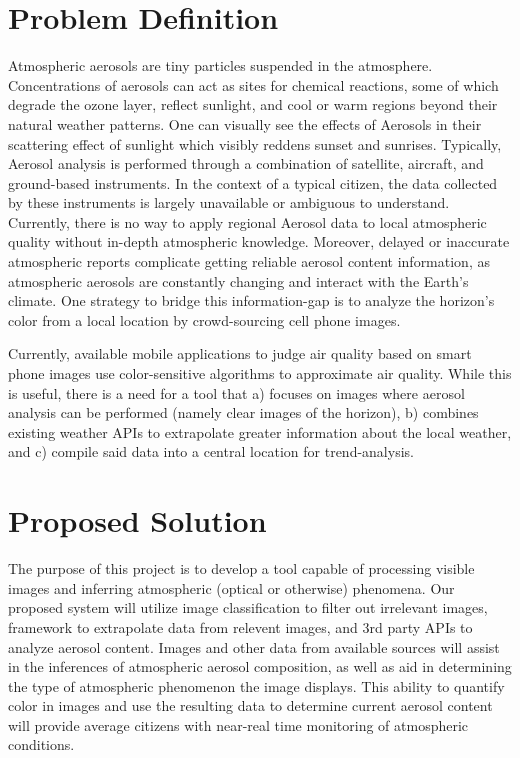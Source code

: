 \documentclass[letterpaper,10pt,draftclsnofoot,onecolumn]{IEEEtran}
\begin{document}
\clearpage
\begin{flushleft}
\section{Problem Definition}
Atmospheric aerosols are tiny particles suspended in the atmosphere. Concentrations of aerosols can act as sites for chemical reactions, some of which degrade the ozone layer, reflect sunlight, and cool or warm regions beyond their natural weather patterns. One can visually see the effects of Aerosols in their scattering effect of sunlight which visibly reddens sunset and sunrises. Typically, Aerosol analysis is performed through a combination of satellite, aircraft, and ground-based instruments. In the context of a typical citizen, the data collected by these instruments is largely unavailable or ambiguous to understand. Currently, there is no way to apply regional Aerosol data to local atmospheric quality without in-depth atmospheric knowledge. Moreover, delayed or inaccurate atmospheric reports complicate getting reliable aerosol content information, as atmospheric aerosols are constantly changing and interact with the Earth's climate. One strategy to bridge this information-gap is to analyze the horizon's color from a local location by crowd-sourcing cell phone images. 
 
Currently, available mobile applications to judge air quality based on smart phone images use color-sensitive algorithms to approximate air quality. While this is useful, there is a need for a tool that a) focuses on images where aerosol analysis can be performed (namely clear images of the horizon), b) combines existing weather APIs to extrapolate greater information about the local weather, and c) compile said data into a central location for trend-analysis.


\section{Proposed Solution}
The purpose of this project is to develop a tool capable of processing visible images and inferring atmospheric (optical or otherwise) phenomena.
Our proposed system will utilize image classification to filter out irrelevant images, framework to extrapolate data from relevent images, and 3rd party APIs to analyze aerosol content.
Images and other data from available sources will assist in the inferences of atmospheric aerosol composition, as well as aid in determining the type of atmospheric phenomenon the image displays.
This ability to quantify color in images and use the resulting data to determine current aerosol content will provide average citizens with near-real time monitoring of atmospheric conditions.


\end{flushleft}
\end{document}
